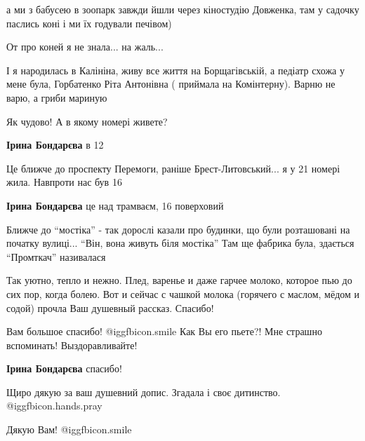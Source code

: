 \begin{itemize}
\begin{itemize}
а ми з бабусею в зоопарк завжди йшли через кіностудію Довженка, там у садочку
паслись коні і ми їх годували печівом)


От про коней я не знала... на жаль...
\end{itemize} %


І я народилась в Калініна, живу все життя на Борщагівській, а педіатр схожа у
мене була, Горбатенко Ріта Антонівна ( приймала на Комінтерну). Варню не варю, а
гриби мариную

\begin{itemize} %
Як чудово! А в якому номері живете?

\textbf{Ірина Бондарєва} в 12

Це ближче до проспекту Перемоги, раніше Брест-Литовський... я у 21 номері жила. Навпроти нас був 16

\textbf{Ірина Бондарєва} це над трамваєм, 16 поверховий


Ближче до \enquote{мостіка} - так дорослі казали про будинки, що були розташовані на
початку вулиці... \enquote{Він, вона живуть біля мостіка} Там ще фабрика була,
здається \enquote{Промткач} називалася

\end{itemize} %


Так уютно, тепло и нежно. Плед, варенье и даже гарчее молоко, которое пью до
сих пор, когда болею. Вот и сейчас с чашкой молока (горячего с маслом, мёдом и
содой) прочла Ваш душевный рассказ. Спасибо!

\begin{itemize} %

Вам большое спасибо! @igg{fbicon.smile} 
Как Вы его пьете?! Мне страшно вспоминать! Выздоравливайте!

\textbf{Ірина Бондарєва} спасибо!

\end{itemize} %

Щиро дякую за ваш душевний допис. Згадала і своє дитинство. @igg{fbicon.hands.pray} 

Дякую Вам! @igg{fbicon.smile} 



\end{itemize}
